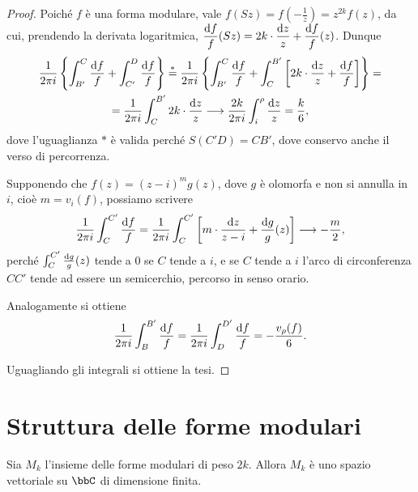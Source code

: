 \begin{proof}
	Poiché $f$ è una forma modulare, vale $f(Sz)=f(-\frac{1}{z})=z^{2k}f(z)$, da cui, prendendo la derivata logaritmica,
	$\displaystyle\frac{\text{d} f}{f}(Sz)=2k\cdot\frac{\text{d} z}{z}+\frac{\text{d} f}{f}(z)$. Dunque
	\begin{multline}
		\frac{1}{2\pi i}\left\{ \int_{B'}^C\frac{\de f}{f} + \int_{C'}^D\frac{\de f}{f} \right\} \overset{*}{=} %
		\frac{1}{2\pi i}\left\{ \int_{B'}^C\frac{\de f}{f} + \int_{C}^{B'} \left[2k \cdot \frac{\de z}{z} + \frac{\de f}{f}\right] \right\} = \\
		= \frac{1}{2\pi i}\int_{C}^{B'} 2k \cdot \frac{\de z}{z} \longrightarrow \frac{2k}{2\pi i}\int_i^\rho \frac{\de z}{z} = \frac{k}{6},
	\end{multline}
	dove l'uguaglianza $*$ è valida perché $S(C'D)=CB'$, dove conservo anche il verso di percorrenza.
	
	Supponendo che $f(z)=(z-i)^mg(z)$, dove $g$ è olomorfa e non si annulla in $i$, cioè $m=v_i(f)$, possiamo scrivere
	\begin{equation*}
		\frac{1}{2\pi i}\int_C^{C'}\frac{\de f}{f} = \frac{1}{2\pi i}\int_C^{C'}\left[ m\cdot\frac{\de z}{z-i} + %
		\frac{\de g}{g}(z) \right] \longrightarrow -\frac{m}{2},
	\end{equation*}
	perché $\int_C^{C'}\frac{\text{d} g}{g}(z)$ tende a $0$ se $C$ tende a $i$, e se $C$ tende a $i$ l'arco di circonferenza $CC'$ tende ad essere un semicerchio, percorso in senso orario.
	
	Analogamente si ottiene 
	\begin{equation*}
		\frac{1}{2\pi i}\int_B^{B'}\frac{\text{d} f}{f}=\frac{1}{2\pi i}\int_D^{D'}\frac{\text{d} f}{f}=-\frac{v_\rho(f)}{6}.
	\end{equation*}
	
	Uguagliando gli integrali si ottiene la tesi.
\end{proof}

\section{Struttura delle forme modulari}

\begin{corollario}
	Sia $M_k$ l'insieme delle forme modulari di peso $2k$. Allora $M_k$ è uno spazio vettoriale su $\bbC$ di dimensione finita.
\end{corollario}

